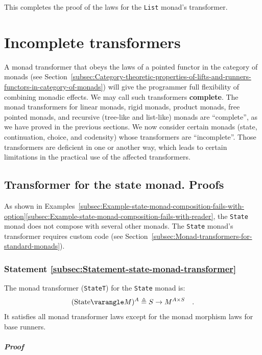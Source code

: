 This completes the proof of the laws for the \lstinline!List! monad\textsf{'}s
transformer.

\section{Incomplete transformers}

A monad transformer that obeys the laws of a pointed functor in the
category of monads (see Section~\ref{subsec:Category-theoretic-properties-of-lifts-and-runners-functors-in-category-of-monads})
will give the programmer full flexibility of combining monadic effects.
We may call such transformers \textbf{complete}.
The monad transformers for linear monads, rigid monads, product monads,
free pointed monads, and recursive (tree-like and list-like) monads
are \textsf{``}complete\textsf{''}, as we have proved in the previous sections. We
now consider certain monads (state, continuation, choice, and codensity)
whose transformers are \textsf{``}incomplete\textsf{''}. Those transformers are deficient
in one or another way, which leads to certain limitations in the practical
use of the affected transformers.

\subsection{Transformer for the state monad. Proofs}

As shown in Examples~\ref{subsec:Example-state-monad-composition-fails-with-option}\textendash \ref{subsec:Example-state-monad-composition-fails-with-reader},
the \lstinline!State! monad does not compose with several other monads.
The \lstinline!State! monad\textsf{'}s transformer requires custom code (see
Section~\ref{subsec:Monad-transformers-for-standard-monads}).

\subsubsection{Statement \label{subsec:Statement-state-monad-transformer}\ref{subsec:Statement-state-monad-transformer}}

The monad transformer (\lstinline!StateT!) for the \lstinline!State!
monad is:
\[
(\text{State}\varangle M)^{A}\triangleq S\rightarrow M^{A\times S}\quad.
\]
It satisfies all monad transformer laws except for the monad morphism
laws for base runners.

\subparagraph{Proof}

